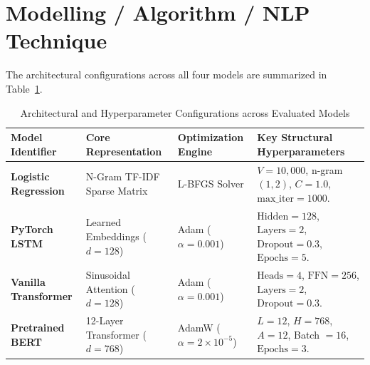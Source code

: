 \section{Modelling / Algorithm / NLP Technique}
The architectural configurations across all four models are summarized in Table~\ref{tab:exp7_model_arch}.
\begin{table}[H]
\centering
\small
\caption{Architectural and Hyperparameter Configurations across Evaluated Models}
\label{tab:exp7_model_arch}
\begin{tabularx}{\textwidth}{lp{3.5cm}p{3cm}X}
\toprule
\textbf{Model Identifier} & \textbf{Core Representation} & \textbf{Optimization Engine} & \textbf{Key Structural Hyperparameters} \\
\midrule
\textbf{Logistic Regression} & N-Gram TF-IDF Sparse Matrix & L-BFGS Solver & $V = 10,000$, n-gram $(1, 2)$, $C = 1.0$, $\text{max\_iter} = 1000$. \\
\textbf{PyTorch LSTM} & Learned Embeddings ($d=128$) & Adam ($\alpha = 0.001$) & $\text{Hidden} = 128$, $\text{Layers} = 2$, $\text{Dropout} = 0.3$, $\text{Epochs} = 5$. \\
\textbf{Vanilla Transformer} & Sinusoidal Attention ($d=128$) & Adam ($\alpha = 0.001$) & $\text{Heads} = 4$, $\text{FFN} = 256$, $\text{Layers} = 2$, $\text{Dropout} = 0.3$. \\
\textbf{Pretrained BERT} & 12-Layer Transformer ($d=768$) & AdamW ($\alpha = 2\times 10^{-5}$) & $L = 12$, $H = 768$, $A = 12$, Batch $= 16$, $\text{Epochs} = 3$. \\
\bottomrule
\end{tabularx}
\end{table}


